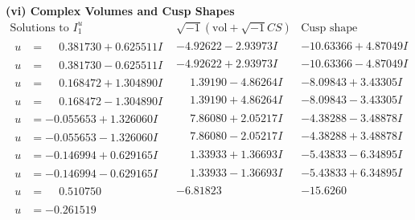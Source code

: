 \documentclass[1p]{elsarticle_modified}
\theoremstyle{definition}
\newcommand{\I}{\sqrt{-1}}
\begin{document}
\newpage\flushleft \textbf{(vi) Complex Volumes and Cusp Shapes}
$$\begin{array}{c|c|c}  
\text{Solutions to }I^u_{1}& \I (\text{vol} + \sqrt{-1}CS) & \text{Cusp shape}\\
 \hline 
\begin{aligned}
u &= \phantom{-}0.381730 + 0.625511 I\end{aligned}
 & -4.92622 - 2.93973 I & -10.63366 + 4.87049 I \\ \hline\begin{aligned}
u &= \phantom{-}0.381730 - 0.625511 I\end{aligned}
 & -4.92622 + 2.93973 I & -10.63366 - 4.87049 I \\ \hline\begin{aligned}
u &= \phantom{-}0.168472 + 1.304890 I\end{aligned}
 & \phantom{-}1.39190 - 4.86264 I & -8.09843 + 3.43305 I \\ \hline\begin{aligned}
u &= \phantom{-}0.168472 - 1.304890 I\end{aligned}
 & \phantom{-}1.39190 + 4.86264 I & -8.09843 - 3.43305 I \\ \hline\begin{aligned}
u &= -0.055653 + 1.326060 I\end{aligned}
 & \phantom{-}7.86080 + 2.05217 I & -4.38288 - 3.48878 I \\ \hline\begin{aligned}
u &= -0.055653 - 1.326060 I\end{aligned}
 & \phantom{-}7.86080 - 2.05217 I & -4.38288 + 3.48878 I \\ \hline\begin{aligned}
u &= -0.146994 + 0.629165 I\end{aligned}
 & \phantom{-}1.33933 + 1.36693 I & -5.43833 - 6.34895 I \\ \hline\begin{aligned}
u &= -0.146994 - 0.629165 I\end{aligned}
 & \phantom{-}1.33933 - 1.36693 I & -5.43833 + 6.34895 I \\ \hline\begin{aligned}
u &= \phantom{-}0.510750\phantom{ +0.000000I}\end{aligned}
 & -6.81823\phantom{ +0.000000I} & -15.6260\phantom{ +0.000000I} \\ \hline\begin{aligned}
u &= -0.261519\phantom{ +0.000000I}\end{aligned}

\end{array}$$
\end{document}
